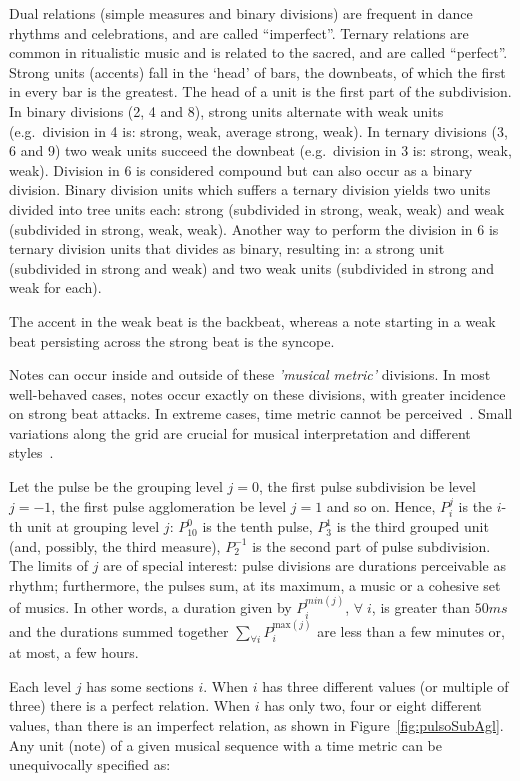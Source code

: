 Dual relations (simple measures and binary divisions) are frequent in dance rhythms and celebrations, and are called ``imperfect''. Ternary relations are common in
ritualistic music and is related to the sacred, and are called ``perfect''. Strong units (accents) fall in the `head' of bars, the downbeats, of which the first in
every bar is the greatest. The head of a unit is the first part of the subdivision. In binary divisions (2, 4
and 8), strong units alternate with weak units
(e.g.\ division in 4 is: strong, weak, average strong, weak). In ternary divisions
(3, 6 and 9) two weak units succeed the downbeat (e.g.\ division in 3 is:
strong, weak, weak). Division in 6 is considered compound but can also
occur as a binary division. Binary division units which suffers a ternary division yields two units divided into tree units each: strong (subdivided in strong,
weak, weak) and weak (subdivided in strong, weak, weak). Another way to perform
the division in 6 is ternary division units that divides as binary,
resulting in: a strong unit (subdivided in strong and weak) and two weak units
(subdivided in strong and weak for each).

The accent in the weak beat is the backbeat, whereas a note starting in a weak beat persisting across the strong beat is the syncope.

Notes can occur inside and outside of these \emph{'musical metric'} divisions. In most well-behaved cases, notes occur exactly on these divisions, with greater incidence on strong beat attacks.
In extreme cases, time metric cannot be perceived~\cite{Roederer}. 
Small variations along the grid are crucial for musical interpretation and
different styles~\cite{Cook}.


Let the pulse be the grouping level $j=0$, the first pulse subdivision  be level $j=-1$,
the first pulse agglomeration be level $j=1$ and so on. Hence, $P_i^j$ is the $i$-th unit at grouping level $j$: $P^0_{10}$ is the tenth pulse, $P^{1}_3$ is the third grouped unit (and, possibly, the third measure),
$P^{-1}_2$ is the second part of pulse subdivision. The limits of $j$ are of special interest: pulse divisions are durations perceivable as rhythm; furthermore, the pulses sum, at its maximum, a music or a cohesive set of musics. In other words, a duration given
by $P^{min(j)}_i$, $\forall \; i$, is greater than $50 ms$ and the durations
summed together $\sum_{\forall i}P^{\text{max}(j)}_i$ are less than a few
minutes or, at most, a few hours.

Each level $j$ has some sections $i$. When $i$ has three different
values (or multiple of three) there is a perfect relation. When $i$ has only
two, four or eight different values, than there is an imperfect relation,
as shown in Figure~\ref{fig:pulsoSubAgl}. Any unit (note) of a given musical sequence with a time metric can be unequivocally
specified as:

